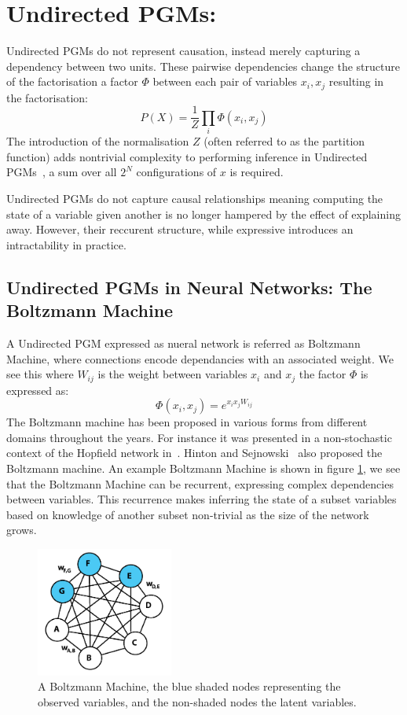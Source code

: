 \section{Undirected PGMs:}

Undirected PGMs do not represent causation, instead merely capturing a dependency between two units. These pairwise dependencies change the structure of the factorisation a factor $\Phi$ between each pair of variables $x_i,x_j$ resulting in the factorisation:
$$
P(X) = \frac{1}{Z} \prod_i \Phi(x_i, x_j)
$$
The introduction of the normalisation $Z$ (often referred to as the partition function) adds nontrivial complexity to performing inference in Undirected PGMs~\cite{Salakhutdinov08learningand}, a sum over all $2^N$ configurations of $x$ is required.

Undirected PGMs do not capture causal relationships meaning computing the state of a variable given another is no longer hampered by the effect of explaining away. However, their reccurent structure, while expressive introduces an intractability in practice.

\subsection{Undirected PGMs in Neural Networks: The Boltzmann Machine}
A Undirected PGM expressed as nueral network is referred as Boltzmann Machine, where connections encode dependancies with an associated weight. We see this where $W_{ij}$ is the weight between variables $x_i$ and $x_j$ the factor $\Phi$ is expressed as:
$$
\Phi(x_i, x_j) = e^{x_ix_jW_{ij}}
$$
The Boltzmann machine has been proposed in various forms from different domains throughout the years. For instance it was presented in a non-stochastic context of the Hopfield network in~\cite{Hopfield01041982}. Hinton and Sejnowski~\cite{geoffreye.hintonterrencej.sejnowski1983} also proposed the Boltzmann machine. An example Boltzmann Machine is shown in figure \ref{F:Boltzmann-Machine}, we see that the Boltzmann Machine can be recurrent, expressing complex dependencies between variables. This recurrence makes inferring the state of a subset variables based on knowledge of another subset non-trivial as the size of the network grows.
\begin{figure}[h]
\begin{center}
  \includegraphics[width = 0.4\textwidth]{Assets/Boltzmann_Machine.png}
\caption{A Boltzmann Machine, the blue shaded nodes representing the observed variables, and the non-shaded nodes the latent variables.}
\label{F:Boltzmann-Machine}
\end{center}
\end{figure}

